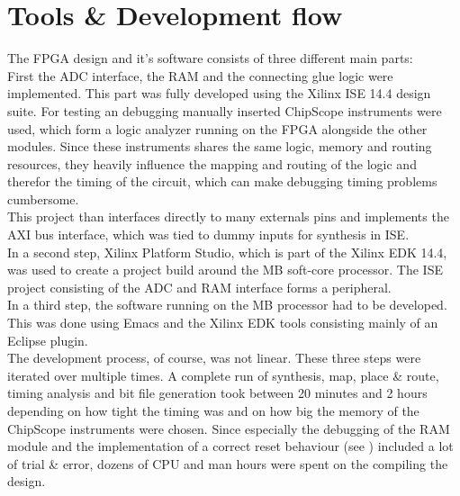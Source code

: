 \section{Tools \& Development flow}
\label{sec:fpga_tools}

The \gls{FPGA} design and it's software consists of three different
main parts: \\

First the \gls{ADC} interface, the \gls{RAM} and the connecting
glue logic were implemented.
This part was fully developed using the Xilinx ISE 14.4
design suite. For testing an debugging manually inserted ChipScope
instruments were used, which form a logic analyzer running on the \gls{FPGA}
alongside the other modules. Since these instruments shares the same logic,
memory and routing resources, they heavily influence the mapping and routing
of the logic and therefor the timing of the circuit, which can make debugging
timing problems cumbersome. \\
This project than interfaces directly to many externals pins and implements
the \gls{AXI} bus interface, which was tied to dummy inputs for synthesis in
ISE. \\

In a second step, Xilinx Platform Studio, which is part of the Xilinx
\gls{EDK} 14.4, was used to create a project build around the \acrfull{MB}
soft-core processor. The ISE project consisting of the \gls{ADC} and \gls{RAM}
interface forms a peripheral. \\

In a third step, the software running on the \gls{MB} processor had to be
developed. This was done using Emacs and the Xilinx \gls{EDK} tools
consisting mainly of an Eclipse plugin. \\

The development process, of course, was not linear. These three steps were
iterated over multiple times. A complete run of synthesis, map,
place \& route, timing analysis and bit file generation
took between 20 minutes and 2 hours depending on how tight the timing was
and on how big the memory of the ChipScope instruments were chosen.
Since especially the debugging of the \gls{RAM} module and the implementation of
a correct reset behaviour (see ) included a lot of
trial \& error, dozens of \gls{CPU} and man hours were spent on the
compiling the design.

